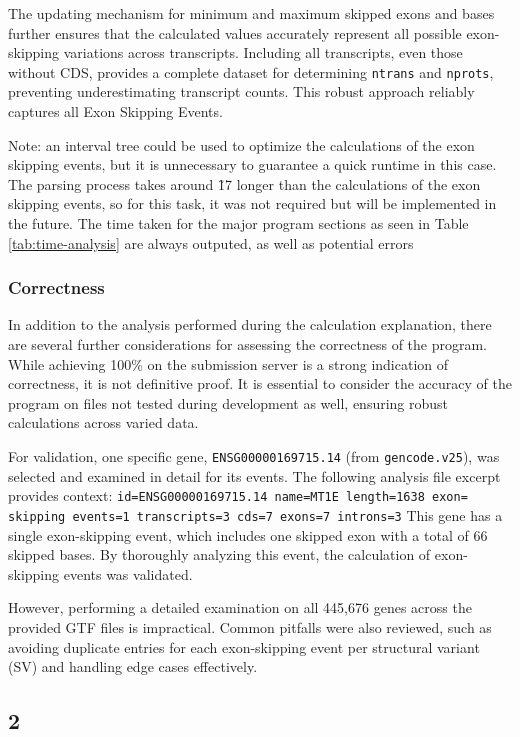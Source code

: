\documentclass{article}
\begin{document}
    The updating mechanism for minimum and maximum skipped exons and bases further ensures that the calculated values accurately represent all possible exon-skipping variations across transcripts. Including all transcripts, even those without CDS, provides a complete dataset for determining \texttt{ntrans} and \texttt{nprots}, preventing underestimating transcript counts. This robust approach reliably captures all Exon Skipping Events.

    Note: an interval tree could be used to optimize the calculations of the exon skipping events, but it is unnecessary to guarantee a quick runtime in this case. The parsing process takes around \~17 longer than the calculations of the exon skipping events, so for this task, it was not required but will be implemented in the future. The time taken for the major program sections as seen in Table \ref{tab:time-analysis} are always outputed, as well as potential errors

    \subsubsection{Correctness}
    In addition to the analysis performed during the calculation explanation, there are several further considerations for assessing the correctness of the program. While achieving 100\% on the submission server is a strong indication of correctness, it is not definitive proof. It is essential to consider the accuracy of the program on files not tested during development as well, ensuring robust calculations across varied data.

    For validation, one specific gene, \texttt{ENSG00000169715.14} (from \texttt{gencode.v25}), was selected and examined in detail for its events. The following analysis file excerpt provides context:
    \texttt{id=ENSG00000169715.14 name=MT1E length=1638 exon= skipping events=1 transcripts=3 cds=7 exons=7 introns=3}
    This gene has a single exon-skipping event, which includes one skipped exon with a total of 66 skipped bases. By thoroughly analyzing this event, the calculation of exon-skipping events was validated.

    However, performing a detailed examination on all 445,676 genes across the provided GTF files is impractical. Common pitfalls were also reviewed, such as avoiding duplicate entries for each exon-skipping event per structural variant (SV) and handling edge cases effectively.

    \subsection{2}
\end{document}
